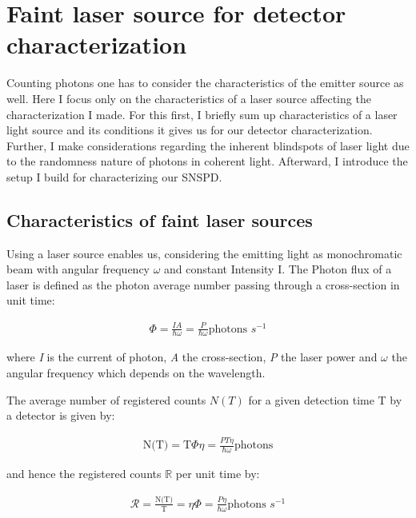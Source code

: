 
\chapter{Faint laser source for detector characterization}
\label{sec:SNSPD_setup}

Counting photons one has to consider the characteristics of the emitter source as well.
Here I focus only on the characteristics of a laser source affecting the characterization I made.
For this first, I briefly sum up characteristics of a laser light source and its conditions it gives us for our detector
characterization.
Further, I make considerations regarding the inherent blindspots of laser light due to the randomness nature of photons
in coherent light.
Afterward, I introduce the setup I build for characterizing our SNSPD.\\

\section{Characteristics of faint laser sources}

Using a laser source enables us, considering the emitting light as monochromatic beam with angular frequency $\omega$
and constant Intensity I. The Photon flux of a laser is defined as the photon average number passing through
a cross-section in unit time:

\begin{align}
    \Phi = \frac{I A}{\hbar \omega} = \frac{P}{\hbar \omega} \text{photons $s^{-1}$}
\end{align}

where \textit{I} is the current of photon, \textit{A} the cross-section, \textit{P} the laser power and $\omega$ the angular frequency which
depends on the wavelength.

The average number of registered counts $N(T)$ for a given detection time T by a detector is given by:

\begin{align}
    \text{N(T)} = \text{T} \Phi \eta= \frac{P T \eta}{\hbar \omega} \text{photons}
\end{align}

and hence the registered counts $\mathbb{R}$ per unit time by:

\begin{align}
    \mathcal{R} = \frac{\text{N(T)}}{\text{T}} = \eta \Phi= \frac{P \eta}{\hbar \omega} \text{photons  $s^{-1}$}
\end{align}

